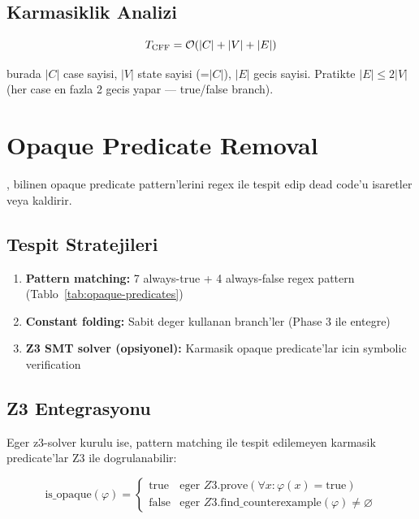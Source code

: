 \subsection{Karmasiklik Analizi}

\begin{equation}
T_{\text{CFF}} = \mathcal{O}\!\left(|C| + |V| + |E|\right)
\end{equation}

burada $|C|$ case sayisi, $|V|$ state sayisi (=$|C|$), $|E|$ gecis sayisi. Pratikte $|E| \leq 2|V|$ (her case en fazla 2 gecis yapar --- true/false branch).


\section{Opaque Predicate Removal}
\label{sec:opaque-removal}

, bilinen opaque predicate pattern'lerini regex ile tespit edip dead code'u isaretler veya kaldirir.

\subsection{Tespit Stratejileri}

\begin{enumerate}
\item \textbf{Pattern matching:} 7 always-true + 4 always-false regex pattern (Tablo~\ref{tab:opaque-predicates})
\item \textbf{Constant folding:} Sabit deger kullanan branch'ler (Phase 3 ile entegre)
\item \textbf{Z3 SMT solver (opsiyonel):} Karmasik opaque predicate'lar icin symbolic verification
\end{enumerate}

\subsection{Z3 Entegrasyonu}

Eger z3-solver kurulu ise, pattern matching ile tespit edilemeyen karmasik predicate'lar Z3 ile dogrulanabilir:

\begin{equation}
\text{is\_opaque}(\varphi) = \begin{cases}
\text{true} & \text{eger } Z3.\text{prove}(\forall x: \varphi(x) = \text{true}) \\
\text{false} & \text{eger } Z3.\text{find\_counterexample}(\varphi) \neq \varnothing
\end{cases}
\end{equation}

